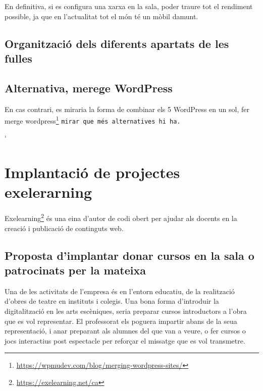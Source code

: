\documentclass[
  10pt,
]{krantz}
\DeclareRobustCommand{\href}[2]{#2\footnote{\url{#1}}}
\begin{document}
En definitiva, si es configura una xarxa en la sala, poder traure tot el rendiment possible, ja que en l'actualitat tot el món té un mòbil damunt.

\hypertarget{organitzaciuxf3-dels-diferents-apartats-de-les-fulles}{%
\section{Organització dels diferents apartats de les fulles}\label{organitzaciuxf3-dels-diferents-apartats-de-les-fulles}}

\hypertarget{alternativa-merege-wordpress}{%
\section{Alternativa, merege WordPress}\label{alternativa-merege-wordpress}}

En cas contrari, es miraria la forma de combinar els 5 WordPress en un sol, fer \href{https://wpmudev.com/blog/merging-wordpress-sites/}{merge wordpress} \texttt{mirar\ que\ més\ alternatives\ hi\ ha.}

`

\hypertarget{implantaciuxf3-de-projectes-exelerarning}{%
\chapter{Implantació de projectes exelerarning}\label{implantaciuxf3-de-projectes-exelerarning}}

\href{https://exelearning.net/ca}{Exelearning} és una eina d'autor de codi obert per ajudar als docents en la creació i publicació de continguts web.

\hypertarget{proposta-dimplantar-donar-cursos-en-la-sala-o-patrocinats-per-la-mateixa}{%
\section{Proposta d'implantar donar cursos en la sala o patrocinats per la mateixa}\label{proposta-dimplantar-donar-cursos-en-la-sala-o-patrocinats-per-la-mateixa}}

Una de les activitats de l'empresa és en l'entorn educatiu, de la realització d'obres de teatre en instituts i colegis. Una bona forma d'introduir la digitalització en les arts escèniques, seria preparar cursos introductors a l'obra que es vol representar. El professorat els poguera impartir abans de la seua representació, i anar preparant als alumnes del que van a veure, o fer cursos o jocs interactius post espectacle per reforçar el missatge que es vol transmetre.
\end{document}
